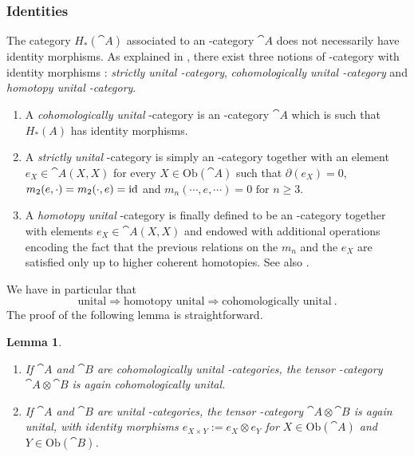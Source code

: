 \documentclass[twoside, 12pt]{amsart}
\newtheorem{lemma}[definition]{Lemma}
\theoremstyle{remark}
\begin{document}
\subsubsection{Identities}

The category $H_*(\cat{A})$ associated to an \Ainf -category $\cat{A}$ does not necessarily have identity morphisms. As explained in \cite[Section 1.2]{Seidel08}, there exist three notions of \Ainf -category with identity morphisms : \textit{strictly unital \Ainf -category}, \textit{cohomologically unital \Ainf -category} and \textit{homotopy unital \Ainf -category}. 
\begin{enumerate}[leftmargin=*,label=(\roman*)]
\item A \textit{cohomologically unital} \Ainf -category is an \Ainf -category $\cat{A}$ which is such that $H_*(A)$ has identity morphisms.
\item A \textit{strictly unital} \Ainf -category is simply an \Ainf -category together with an element $e_X \in \cat{A} (X ,X )$ for every $X \in \mathrm{Ob}(\cat{A})$ such that $\partial (e_X) = 0$, $m_2 (e , \cdot ) = m_2 (\cdot , e ) = \mathrm{id}$ and $m_n ( \cdots , e , \cdots ) = 0 \text { for } n \geq 3$.
\item A \textit{homotopy unital} \Ainf -category is finally defined to be an \Ainf -category together with elements $e_X \in \cat{A} (X ,X )$ and endowed with additional operations encoding the fact that the previous relations on the $m_n$ and the $e_X$ are satisfied only up to higher coherent homotopies. See also \cite[Section 6.1]{HirshMilles12}.
\end{enumerate}
We have in particular that
\[  \text{unital} \Rightarrow \text{homotopy unital} \Rightarrow \text{cohomologically unital} \ . \]
The proof of the following lemma is straightforward.

\begin{lemma}
\begin{enumerate}[leftmargin=*,label=(\roman*)]
\item If $\cat{A}$ and $\cat{B}$ are cohomologically unital \Ainf -categories, the tensor \Ainf -category $\cat{A} \otimes \cat{B}$ is again cohomologically unital. 
\item If $\cat{A}$ and $\cat{B}$ are unital \Ainf -categories, the tensor \Ainf -category $\cat{A} \otimes \cat{B}$ is again unital, with identity morphisms $e_{X \times Y} := e_X \otimes e_Y$ for  $X \in \mathrm{Ob}(\cat{A})$ and $Y \in \mathrm{Ob}(\cat{B})$.
\end{enumerate}
\end{lemma}
\end{document}
